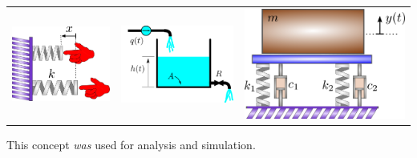 \documentclass[fleqn]{beamer} %
\begin{document}
\begin{frame}
\begin{tabular}{ccc}
\includegraphics[scale=0.15]{images/hand_spring.png}&\includegraphics[scale=0.15]{images/water_tank.png}&\hspace{5mm}\includegraphics[scale=0.10]{images/mass_spring_damper.png}\\
\end{tabular}

This concept {\it was} used for analysis and simulation. 
				


			\end{frame}
\end{document}
